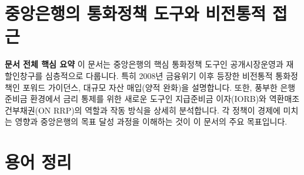 \documentclass[11pt,a4paper]{book}
\theoremstyle{definition}
\begin{document}
\section{중앙은행의 통화정책 도구와 비전통적 접근}

\begin{summarybox}
  \textbf{문서 전체 핵심 요약}
  이 문서는 중앙은행의 핵심 통화정책 도구인 공개시장운영과 재할인창구를 심층적으로 다룹니다.
  특히 2008년 금융위기 이후 등장한 비전통적 통화정책인 포워드 가이던스, 대규모 자산 매입(양적 완화)을 설명합니다.
  또한, 풍부한 은행 준비금 환경에서 금리 통제를 위한 새로운 도구인 지급준비금 이자(IORB)와 역환매조건부채권(ON RRP)의 역할과 작동 방식을 상세히 분석합니다.
  각 정책이 경제에 미치는 영향과 중앙은행의 목표 달성 과정을 이해하는 것이 이 문서의 주요 목표입니다.
\end{summarybox}


\section{용어 정리}
\end{document}
